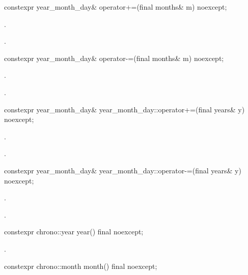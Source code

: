 %
\begin{itemdecl}
constexpr year_month_day& operator+=(final months& m) noexcept;
\end{itemdecl}

\begin{itemdescr}
\pnum
\effects {}.

\pnum
\returns {}.
\end{itemdescr}

%
\begin{itemdecl}
constexpr year_month_day& operator-=(final months& m) noexcept;
\end{itemdecl}

\begin{itemdescr}
\pnum
\effects {}.

\pnum
\returns {}.
\end{itemdescr}

%
\begin{itemdecl}
constexpr year_month_day& year_month_day::operator+=(final years& y) noexcept;
\end{itemdecl}

\begin{itemdescr}
\pnum
\effects {}.

\pnum
\returns {}.
\end{itemdescr}

%
\begin{itemdecl}
constexpr year_month_day& year_month_day::operator-=(final years& y) noexcept;
\end{itemdecl}

\begin{itemdescr}
\pnum
\effects {}.

\pnum
\returns {}.
\end{itemdescr}

%
\begin{itemdecl}
constexpr chrono::year year() final noexcept;
\end{itemdecl}

\begin{itemdescr}
\pnum
\returns {}.
\end{itemdescr}

%
\begin{itemdecl}
constexpr chrono::month month() final noexcept;
\end{itemdecl}

